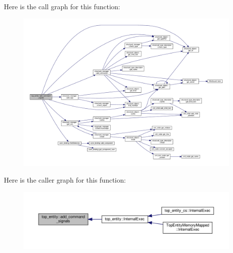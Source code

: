 Here is the call graph for this function\+:
\nopagebreak
\begin{figure}[H]
\begin{center}
\leavevmode
\includegraphics[width=350pt]{d0/d0e/classtop__entity_afe2e448da9ea30c2b071b1c477cb5c9a_cgraph}
\end{center}
\end{figure}
Here is the caller graph for this function\+:
\nopagebreak
\begin{figure}[H]
\begin{center}
\leavevmode
\includegraphics[width=350pt]{d0/d0e/classtop__entity_afe2e448da9ea30c2b071b1c477cb5c9a_icgraph}
\end{center}
\end{figure}
\mbox{\label{classtop__entity_ad1949a318419093124c6a05b5823d0b2}} 
